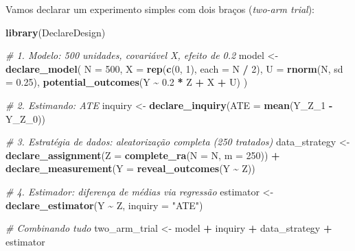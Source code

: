 \documentclass[
]{article}
\newenvironment{Shaded}{\begin{snugshade}}{\end{snugshade}}
\newcommand{\AttributeTok}[1]{\textcolor[rgb]{0.13,0.29,0.53}{#1}}
\newcommand{\CommentTok}[1]{\textcolor[rgb]{0.56,0.35,0.01}{\textit{#1}}}
\newcommand{\DecValTok}[1]{\textcolor[rgb]{0.00,0.00,0.81}{#1}}
\newcommand{\FloatTok}[1]{\textcolor[rgb]{0.00,0.00,0.81}{#1}}
\newcommand{\FunctionTok}[1]{\textcolor[rgb]{0.13,0.29,0.53}{\textbf{#1}}}
\newcommand{\NormalTok}[1]{#1}
\newcommand{\OtherTok}[1]{\textcolor[rgb]{0.56,0.35,0.01}{#1}}
\newcommand{\SpecialCharTok}[1]{\textcolor[rgb]{0.81,0.36,0.00}{\textbf{#1}}}
\newcommand{\StringTok}[1]{\textcolor[rgb]{0.31,0.60,0.02}{#1}}
\begin{document}
Vamos declarar um experimento simples com dois braços (\emph{two-arm trial}):

\begin{Shaded}
\begin{Highlighting}[]
\FunctionTok{library}\NormalTok{(DeclareDesign)}

\CommentTok{\# 1. Modelo: 500 unidades, covariável X, efeito de 0.2}
\NormalTok{model }\OtherTok{\textless{}{-}} \FunctionTok{declare\_model}\NormalTok{(}
  \AttributeTok{N =} \DecValTok{500}\NormalTok{,}
  \AttributeTok{X =} \FunctionTok{rep}\NormalTok{(}\FunctionTok{c}\NormalTok{(}\DecValTok{0}\NormalTok{, }\DecValTok{1}\NormalTok{), }\AttributeTok{each =}\NormalTok{ N }\SpecialCharTok{/} \DecValTok{2}\NormalTok{),}
  \AttributeTok{U =} \FunctionTok{rnorm}\NormalTok{(N, }\AttributeTok{sd =} \FloatTok{0.25}\NormalTok{),}
  \FunctionTok{potential\_outcomes}\NormalTok{(Y }\SpecialCharTok{\textasciitilde{}} \FloatTok{0.2} \SpecialCharTok{*}\NormalTok{ Z }\SpecialCharTok{+}\NormalTok{ X }\SpecialCharTok{+}\NormalTok{ U)}
\NormalTok{)}

\CommentTok{\# 2. Estimando: ATE}
\NormalTok{inquiry }\OtherTok{\textless{}{-}} \FunctionTok{declare\_inquiry}\NormalTok{(}\AttributeTok{ATE =} \FunctionTok{mean}\NormalTok{(Y\_Z\_1 }\SpecialCharTok{{-}}\NormalTok{ Y\_Z\_0))}

\CommentTok{\# 3. Estratégia de dados: aleatorização completa (250 tratados)}
\NormalTok{data\_strategy }\OtherTok{\textless{}{-}} \FunctionTok{declare\_assignment}\NormalTok{(}\AttributeTok{Z =} \FunctionTok{complete\_ra}\NormalTok{(}\AttributeTok{N =}\NormalTok{ N, }\AttributeTok{m =} \DecValTok{250}\NormalTok{)) }\SpecialCharTok{+}
  \FunctionTok{declare\_measurement}\NormalTok{(}\AttributeTok{Y =} \FunctionTok{reveal\_outcomes}\NormalTok{(Y }\SpecialCharTok{\textasciitilde{}}\NormalTok{ Z))}

\CommentTok{\# 4. Estimador: diferença de médias via regressão}
\NormalTok{estimator }\OtherTok{\textless{}{-}} \FunctionTok{declare\_estimator}\NormalTok{(Y }\SpecialCharTok{\textasciitilde{}}\NormalTok{ Z, }\AttributeTok{inquiry =} \StringTok{"ATE"}\NormalTok{)}

\CommentTok{\# Combinando tudo}
\NormalTok{two\_arm\_trial }\OtherTok{\textless{}{-}}\NormalTok{ model }\SpecialCharTok{+}\NormalTok{ inquiry }\SpecialCharTok{+}\NormalTok{ data\_strategy }\SpecialCharTok{+}\NormalTok{ estimator}
\end{Highlighting}
\end{Shaded}
\end{document}
